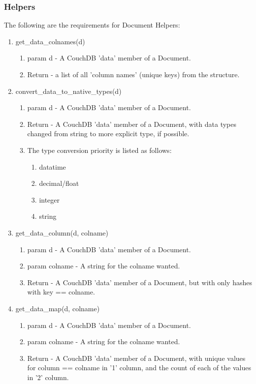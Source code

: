 \subsubsection{Helpers}
The following are the requirements for Document Helpers:
\begin{enumerate}
	\item get\_data\_colnames(d)
	\begin{enumerate}
		\item param d - A CouchDB 'data' member of a Document. 
		\item Return - a list of all 'column names' (unique keys) from the 
			structure.
	\end{enumerate}

	\item convert\_data\_to\_native\_types(d)
	\begin{enumerate}
		\item param d - A CouchDB 'data' member of a Document. 
		\item Return - A CouchDB 'data' member of a Document, with data types
			changed from string to more explicit type, if possible.
		\item The type conversion priority is listed as follows:
		\begin{enumerate}
			\item datatime
			\item decimal/float
			\item integer
			\item string
		\end{enumerate}
	\end{enumerate}

	\item get\_data\_column(d, colname)
	\begin{enumerate}
		\item param d - A CouchDB 'data' member of a Document. 
		\item param colname - A string for the colname wanted.
		\item Return - A CouchDB 'data' member of a Document, but with only
			hashes with key == colname.
	\end{enumerate}

	\item get\_data\_map(d, colname)
	\begin{enumerate}
		\item param d - A CouchDB 'data' member of a Document. 
		\item param colname - A string for the colname wanted.
		\item Return - A CouchDB 'data' member of a Document, with unique
			values for column == colname in '1' column, and the count of
			each of the values in '2' column.
	\end{enumerate}


\end{enumerate}
